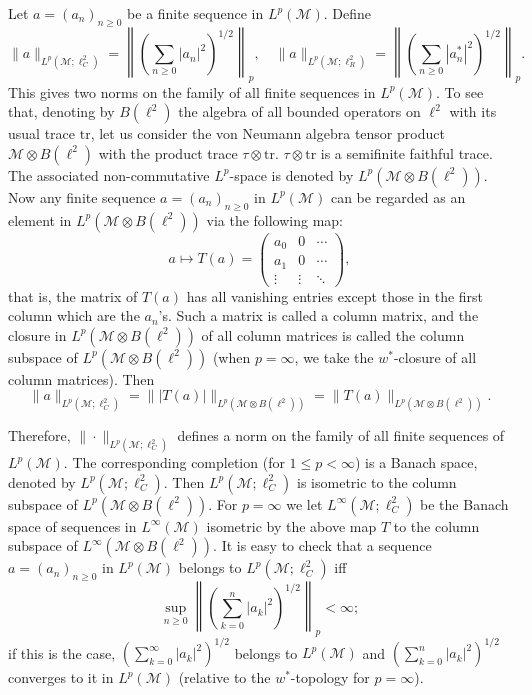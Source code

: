\documentclass[reqno]{amsart}
\numberwithin{equation}{section}
\begin{document}
Let $a = (a_n)_{n \geq 0}$ be a finite sequence in $L^p(\mathcal{M})$. Define
\[
\|a\|_{L^p(\mathcal{M}; \ell^2_C)} = \left\|\left(\sum_{n \geq 0} |a_n|^2 \right)^{1/2}\right\|_p, \quad \|a\|_{L^p(\mathcal{M}; \ell^2_R)} = \left\|\left(\sum_{n \geq 0} |a_n^*|^2 \right)^{1/2}\right\|_p.
\]
This gives two norms on the family of all finite sequences in $L^p(\mathcal{M})$. To see that, denoting by $B(\ell^2)$ the algebra of all bounded operators on $\ell^2$ with its usual trace $\mathrm{tr}$, let us consider the von Neumann algebra tensor product $\mathcal{M} \otimes B(\ell^2)$ with the product trace $\tau \otimes \mathrm{tr}$. $\tau \otimes \mathrm{tr}$ is a semifinite faithful trace. The associated non-commutative $L^p$-space is denoted by $L^p(\mathcal{M} \otimes B(\ell^2))$. Now any finite sequence $a = (a_n)_{n \geq 0}$ in $L^p(\mathcal{M})$ can be regarded as an element in $L^p(\mathcal{M} \otimes B(\ell^2))$ via the following map:
\[
a \mapsto T(a) = \begin{pmatrix}
a_0 & 0 & \cdots \\
a_1 & 0 & \cdots \\
\vdots & \vdots & \ddots
\end{pmatrix},
\]
that is, the matrix of $T(a)$ has all vanishing entries except those in the first column which are the $a_n$'s. Such a matrix is called a column matrix, and the closure in $L^p(\mathcal{M} \otimes B(\ell^2))$ of all column matrices is called the column subspace of $L^p(\mathcal{M} \otimes B(\ell^2))$ (when $p = \infty$, we take the $w^*$-closure of all column matrices). Then
\[
\|a\|_{L^p(\mathcal{M}; \ell^2_C)} = \| |T(a)| \|_{L^p(\mathcal{M} \otimes B(\ell^2))} = \|T(a)\|_{L^p(\mathcal{M} \otimes B(\ell^2))}.
\]

Therefore, $\|\cdot\|_{L^p(\mathcal{M}; \ell^2_C)}$ defines a norm on the family of all finite sequences of $L^p(\mathcal{M})$. The corresponding completion (for $1 \leq p < \infty$) is a Banach space, denoted by $L^p(\mathcal{M}; \ell^2_C)$. Then $L^p(\mathcal{M}; \ell^2_C)$ is isometric to the column subspace of $L^p(\mathcal{M} \otimes B(\ell^2))$. For $p = \infty$ we let $L^\infty(\mathcal{M}; \ell^2_C)$ be the Banach space of sequences in $L^\infty(\mathcal{M})$ isometric by the above map $T$ to the column subspace of $L^\infty(\mathcal{M} \otimes B(\ell^2))$. It is easy to check that a sequence $a = (a_n)_{n \geq 0}$ in $L^p(\mathcal{M})$ belongs to $L^p(\mathcal{M}; \ell^2_C)$ iff
\[
\sup_{n \geq 0} \left\| \left( \sum_{k=0}^{n} |a_k|^2 \right)^{1/2} \right\|_p < \infty;
\]
if this is the case, $\left( \sum_{k=0}^{\infty} |a_k|^2 \right)^{1/2}$
belongs to $L^p(\mathcal{M})$ and $\left( \sum_{k=0}^{n} |a_k|^2 \right)^{1/2}$
converges to it in $L^p(\mathcal{M})$ (relative to the $w^*$-topology for $p = \infty$).
\end{document}
